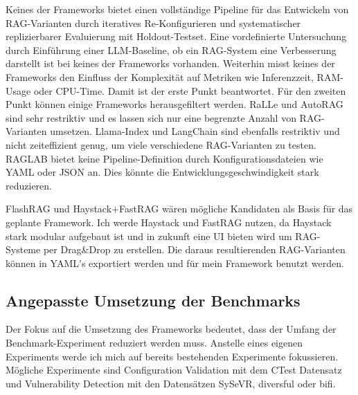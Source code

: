 \documentclass[letterpaper, 10 pt, conference]{ieeeconf}
\begin{document}
Keines der Frameworks bietet einen vollständige Pipeline für das Entwickeln von RAG-Varianten durch iteratives Re-Konfigurieren und systematischer replizierbarer Evaluierung mit Holdout-Testset. 
Eine vordefinierte Untersuchung durch Einführung einer LLM-Baseline, ob ein RAG-System eine Verbesserung darstellt ist bei keines der Frameworks vorhanden.
Weiterhin misst keines der Frameworks den Einfluss der Komplexität auf Metriken wie Inferenzzeit, RAM-Usage oder CPU-Time. 
Damit ist der erste Punkt beantwortet. Für den zweiten Punkt können einige Frameworks herausgefiltert werden.
RaLLe und AutoRAG sind sehr restriktiv und es lassen sich nur eine begrenzte Anzahl von RAG-Varianten umsetzen. Llama-Index und LangChain sind ebenfalls restriktiv und nicht zeiteffizient genug, um viele verschiedene RAG-Varianten zu testen.
RAGLAB bietet keine Pipeline-Definition durch Konfigurationsdateien wie YAML oder JSON an. Dies könnte die Entwicklungsgeschwindigkeit stark reduzieren.

FlashRAG und Haystack+FastRAG wären mögliche Kandidaten als Basis für das geplante Framework. 
Ich werde Haystack und FastRAG nutzen, da Haystack stark modular aufgebaut ist und in zukunft eine UI bieten wird um RAG-Systeme per Drag\&Drop zu erstellen. 
Die daraus resultierenden RAG-Varianten können in YAML's exportiert werden und für mein Framework benutzt werden.\\


\subsection{Angepasste Umsetzung der Benchmarks}
Der Fokus auf die Umsetzung des Frameworks bedeutet, dass der Umfang der Benchmark-Experiment reduziert werden muss. Anstelle eines eigenen Experiments werde ich mich auf bereits bestehenden Experimente fokussieren. 
Mögliche Experimente sind Configuration Validation mit dem CTest Datensatz und Vulnerability Detection mit den Datensätzen SySeVR, diversful oder bifi.



\end{document}
